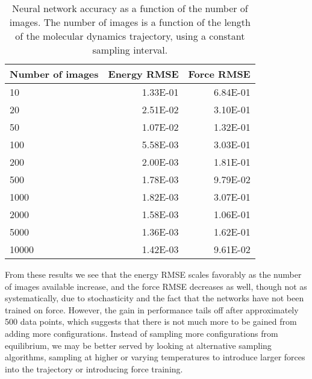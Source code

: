 \begin{table}[H]
\centering
    \caption{Neural network accuracy as a function
        of the number of images. The number of images
        is a function of the length of the molecular dynamics
        trajectory, using a constant sampling interval.}
    \label{table:images}
\begin{tabular}{lrr}
\toprule
Number of images &  Energy RMSE &  Force RMSE \\
\midrule
             10 &     1.33E-01 &    6.84E-01 \\
             20 &     2.51E-02 &    3.10E-01 \\
             50 &     1.07E-02 &    1.32E-01 \\
            100 &     5.58E-03 &    3.03E-01 \\
            200 &     2.00E-03 &    1.81E-01 \\
            500 &     1.78E-03 &    9.79E-02 \\
           1000 &     1.82E-03 &    3.07E-01 \\
           2000 &     1.58E-03 &    1.06E-01 \\
           5000 &     1.36E-03 &    1.62E-01 \\
          10000 &     1.42E-03 &    9.61E-02 \\
\bottomrule
\end{tabular}
\end{table}

From these results we see that the energy RMSE scales favorably as
the number of images available increase, and the force RMSE decreases
as well, though not as systematically, due to stochasticity and
the fact that the networks have not been trained on force.
However, the gain in performance tails off after approximately 500 data points,
which suggests that there is not much more to be gained from
adding more configurations.
Instead of sampling more configurations from equilibrium, we may
be better served by looking at alternative sampling algorithms,
sampling at higher or varying temperatures to introduce larger
forces into the trajectory or introducing force training.
